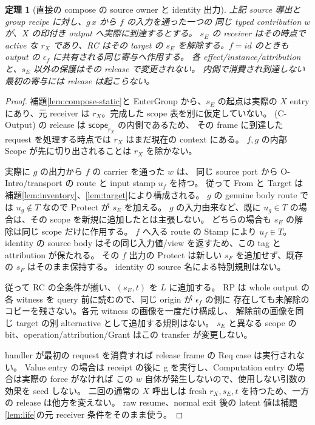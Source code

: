 \documentclass[11pt,a4paper]{article}
\newtheorem{theorem}[definition]{定理}
\newcommand{\Scope}{\mathsf{scope}}
\begin{document}
\begin{theorem}[直接の compose の source owner と identity 出力]
\label{thm:compose-source}
上記 source 導出と group recipe に対し、\(g\,x\) から \(f\) の入力を通った一つの
同じ typed contribution \(w\) が、\(X\) の印付き output へ実際に到達するとする。
\(s_E\) の receiver はその時点で active な \(r_X\) であり、RC はその target の
\(s_E\) を解除する。\(f=id\) のときも output の \(\epsilon_f\) に共有される同じ寄与へ作用する。
各 effect/instance/attribution と、\(s_E\) 以外の保護はその release で変更されない。
内側で消費され到達しない最初の寄与には release は起こらない。
\end{theorem}
\begin{proof}
補題\ref{lem:compose-static}と EnterGroup から、\(s_E\) の起点は実際の
\(X\) entry にあり、元 receiver は \(r_X\)。完成した scope 表を別に仮定していない。
(C-Output) の release は \(\Scope_{r_X}\) の内側であるため、
その frame に到達した request を処理する時点では \(r_X\) はまだ現在の context にある。
\(f,g\) の内部 Scope が先に切り出されることは \(r_X\) を除かない。

実際に \(g\) の出力から \(f\) の carrier を通った \(w\) は、
同じ source port から O-Intro/transport の route と input stamp \(u_f\) を持つ。
従って From と Target は補題\ref{lem:inventory}、\ref{lem:target}により構成される。
\(g\) の genuine body route では \(u_g\notin T\) なので Protect が \(s_E\) を加える。
\(g\) の入力由来など、既に \(u_g\in T\) の場合は、その scope を新規に追加したとは主張しない。
どちらの場合も \(s_E\) の解除は同じ scope だけに作用する。
\(f\) へ入る route の Stamp により \(u_f\in T\)。
identity の source body はその同じ入力値/view を返すため、この tag と attribution が保たれる。
その \(f\) 出力の Protect は新しい \(s_F\) を追加せず、既存の \(s_F\) はそのまま保持する。
identity の source 名による特別規則はない。

従って RC の全条件が揃い、\((s_E,t)\) を \(L\) に追加する。
RP は whole output の各 witness を query 前に読むので、同じ origin が \(\epsilon_f\) の側に
存在しても未解除のコピーを残さない。各元 witness の画像を一度だけ構成し、
解除前の画像を同じ target の別 alternative として追加する規則はない。
\(s_E\) と異なる scope の bit、operation/attribution/Grant はこの transfer が変更しない。

handler が最初の request を消費すれば release frame の Req case は実行されない。
Value entry の場合は receipt の後に g を実行し、Computation entry の場合は実際の force がなければ
この \(w\) 自体が発生しないので、使用しない引数の効果を seed しない。
二回の通常の \(X\) 呼出しは fresh \(r_X,s_E,t\) を持つため、一方の release は他方を変えない。
raw resume、normal exit 後の latent 値は補題\ref{lem:life}の元 receiver 条件をそのまま使う。
\end{proof}
\end{document}
